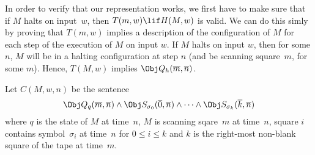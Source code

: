 \documentclass[../../../include/open-logic-section]{subfiles}
\begin{document}

\begin{explain}
 In order to verify that our representation works, we first
have to make sure that if $M$ halts on input~$w$, then $T(m, w) \lif H(M,
w)$ is valid. We can do this simly by proving that $T(m, w)$ implies a
description of the configuration of $M$ for each step of the execution of
$M$ on input $w$. If $M$ halts on input $w$, then for some $n$, $M$ will be
in a halting configuration at step $n$ (and be scanning square~$m$, for
some $m$). Hence, $T(M, w)$ implies $\Obj Q_h(\overline m, \overline n)$.
\end{explain}

\begin{defn} 
Let $C(M, w, n)$ be the sentence 
\[ 
\Obj Q_q(\overline m,
\overline n) \land \Obj S_{\sigma_0}(\overline 0, \overline n) \land \dots
\land \Obj S_{\sigma_k}(\overline k, \overline n) 
\] 
where $q$ is the state
of $M$ at time~$n$, $M$ is scanning sqare~$m$ at time~$n$, square $i$
contains symbol~$\sigma_i$ at time~$n$ for $0 \le i \le k$ and $k$ is the
right-most non-blank square of the tape at time~$m$. 
\end{defn}
\end{document}
